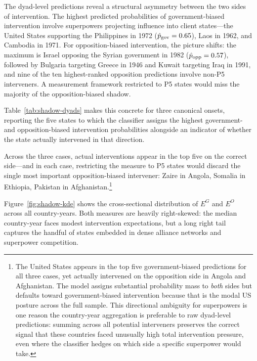 The dyad-level predictions reveal a structural asymmetry between the two
sides of intervention.  The highest predicted probabilities of
government-biased intervention involve superpowers projecting influence into
client states---the United States supporting the Philippines in 1972
($\hat{p}_\text{gov} = 0.65$), Laos in 1962, and Cambodia in 1971.  For
opposition-biased intervention, the picture shifts: the maximum is Israel
opposing the Syrian government in 1982 ($\hat{p}_\text{opp} = 0.57$), followed
by Bulgaria targeting Greece in 1946 and Kuwait targeting Iraq in 1991,
and nine of the ten highest-ranked opposition predictions involve non-P5
interveners.  A measurement framework restricted to P5 states
would miss the majority of the opposition-biased shadow.

Table~\ref{tab:shadow-dyads} makes this concrete for three canonical onsets, reporting
the five states to which the classifier assigns the highest government- and
opposition-biased intervention probabilities alongside an indicator of whether
the state actually intervened in that direction.



Across the three cases, \DyadHits{} actual interventions appear in the top five
on the correct side---and in each case, restricting the measure to P5 states
would discard the single most important opposition-biased intervener: Zaire
in Angola, Somalia in Ethiopia, Pakistan in Afghanistan.\footnote{%
  The United States appears in the top five government-biased predictions for
  all three cases, yet actually intervened on the opposition side in Angola and
  Afghanistan.  The model assigns substantial probability mass to \textit{both} sides
  but defaults toward government-biased intervention because that is the modal
  US posture across the full sample.  This directional ambiguity for superpowers
  is one reason the country-year aggregation is preferable to raw dyad-level
  predictions: summing across all potential interveners preserves the correct
  signal that these countries faced unusually high total intervention pressure,
  even where the classifier hedges on which side a specific superpower would take.}

Figure~\ref{fig:shadow-kde} shows the cross-sectional distribution of $E^G$ and $E^O$
across all country-years.  Both measures are heavily right-skewed: the
median country-year faces modest intervention expectations, but a long
right tail captures the handful of states embedded in dense alliance
networks and superpower competition.

